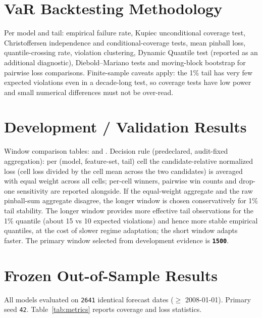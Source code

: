 \documentclass[11pt]{article}
\begin{document}
\section{VaR Backtesting Methodology}
Per model and tail: empirical failure rate, Kupiec unconditional coverage test, Christoffersen independence and conditional-coverage tests, mean pinball loss, quantile-crossing rate, violation clustering, Dynamic Quantile test (reported as an additional diagnostic), Diebold--Mariano tests and moving-block bootstrap for pairwise loss comparisons. Finite-sample caveats apply: the 1\% tail has very few expected violations even in a decade-long test, so coverage tests have low power and small numerical differences must not be over-read.

\section{Development / Validation Results}\label{sec:dev}
Window comparison tables:  and . Decision rule (predeclared, audit-fixed aggregation): per (model, feature-set, tail) cell the candidate-relative normalized loss (cell loss divided by the cell mean across the two candidates) is averaged with equal weight across all cells; per-cell winners, pairwise win counts and drop-one sensitivity are reported alongside. If the equal-weight aggregate and the raw pinball-sum aggregate disagree, the longer window is chosen conservatively for 1\% tail stability. The longer window provides more effective tail observations for the 1\% quantile (about 15 vs 10 expected violations) and hence more stable empirical quantiles, at the cost of slower regime adaptation; the short window adapts faster. The primary window selected from development evidence is \textbf{\texttt{1500}}.

\section{Frozen Out-of-Sample Results}\label{sec:oos}
All models evaluated on \texttt{2641} identical forecast dates ($\ge$ 2008-01-01). Primary seed \texttt{42}. Table~\ref{tab:metrics} reports coverage and loss statistics.
\end{document}
